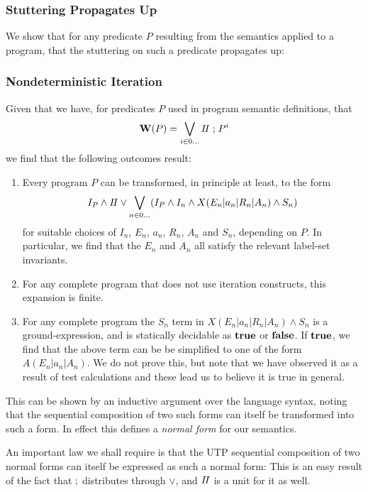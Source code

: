 \subsubsection{Stuttering Propagates Up}

We show that for any predicate $P$ resulting from the
semantics applied to a program,
that the stuttering on such a predicate propagates up:



\subsubsection{Nondeterministic Iteration}

Given that we have,
for predicates $P$ used in program semantic definitions,
that
\[
  \mathbf{W}(P) = \bigvee_{i \in 0\dots} I\!I \mathrel{;} P^i
\]
we find that the following outcomes result:
\begin{enumerate}
  \item
    Every program $P$ can be transformed,
    in principle at least,
    to the form
    \[
      I_P \land I\!I
      \lor
      \bigvee_{n \in 0\dots}  (I_P \land I_n \land X(E_n|a_n|R_n|A_n) \land S_n)
    \]
    for suitable choices of $I_n$, $E_n$, $a_n$, $R_n$, $A_n$ and $S_n$,
    depending on $P$.
    In particular, we find that the $E_n$ and $A_n$ all satisfy the relevant
    label-set invariants.
  \item
    For any complete program that does not use iteration constructs,
    this expansion is finite.
  \item
    For any complete program the $S_n$
    term in $X(E_n|a_n|R_n|A_n) \land S_n$
    is a ground-expression, and is statically decidable as $\mathbf{true}$ or $\mathbf{false}$.
    If $\mathbf{true}$, we find that the above term
    can be be simplified to one of the form $A(E_n|a_n|A_n)$.
    We do not prove this, but note that we have observed it as a result
    of test calculations and these lead us to believe it is true in general.
\end{enumerate}
This can be shown by an inductive argument over the language syntax,
noting that the sequential composition of two such forms
can itself be transformed into such a form.
In effect this defines a \emph{normal form} for our semantics.


An important law we shall require is that the UTP sequential
composition of two normal forms can itself be expressed
as such a normal form:
This is an easy result of the fact that $\mathrel{;}$ distributes through $\lor$,
and $I\!I$ is a unit for it as well.


